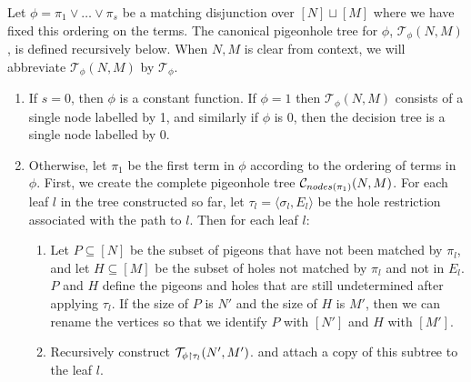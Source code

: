 \begin{definition}
Let $\phi = \pi_1 \lor \ldots \lor \pi_{s}$ be a matching disjunction over $[N] \sqcup [M]$  where we have fixed this ordering on the terms. 
The canonical pigeonhole tree for $\phi$, 
$\mathcal{T}_{\phi}(N,M)$, is defined recursively below. When $N,M$ is clear from context, we will abbreviate $\mathcal{T}_{\phi}(N,M)$ by $\mathcal{T}_{\phi}$.

\begin{enumerate}
    \item If $s=0$, then $\phi$ is a constant function. If $\phi=1$ then $\mathcal{T}_{\phi}(N,M)$ consists of a single node labelled by 1, and similarly if $\phi$ is 0, then the decision tree is a single node labelled by 0.
    \item Otherwise, let $\pi_1$ be the first term in $\phi$ according to the ordering of terms in $\phi$. First, we create the complete pigeonhole tree ${\cal C}_{ nodes(\pi_1)}(N,M)$. For each leaf $l$ in the tree constructed so far, let $\tau_l = \langle \sigma_l,E_l \rangle$ be the hole restriction associated with the path to $l$. Then for each leaf $l$: 
    \begin{enumerate}
        \item Let $P \subseteq [N]$ be the subset of pigeons that have not been matched  by $\pi_l$, and let $H \subseteq [M]$ be the subset of holes not matched by $\pi_l$ and not in $E_l$. $P$ and $H$ define the pigeons and holes that are still undetermined after applying $\tau_l$.  If the size of $P$ is $N'$ and the size of $H$ is $M'$, then we can rename the vertices so that we identify $P$ with $[N']$ and $H$ with $[M']$.
        \item Recursively construct ${\cal T}_{\phi\upharpoonright \tau_l}(N',M')$. and attach a copy of this subtree to the leaf $l$.
    \end{enumerate}
    \end{enumerate}
\end{definition}



